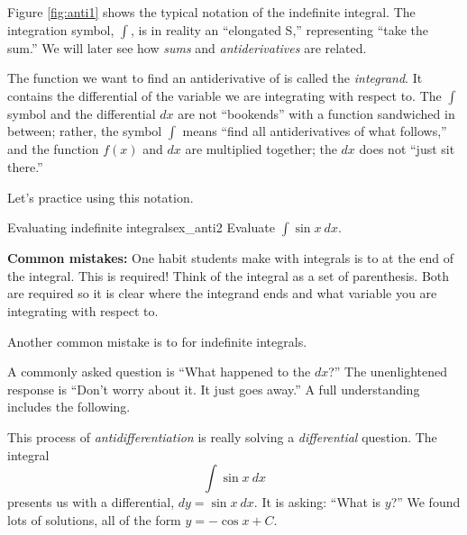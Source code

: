 

Figure \ref{fig:anti1} shows the typical notation of the indefinite integral. The integration symbol, $\int$, is in reality an ``elongated S,'' representing ``take the sum.'' We will later see how \textit{sums} and \textit{antiderivatives} are related.

The function we want to find an antiderivative of is called the \textit{integrand}. It contains the differential of the variable we are integrating with respect to. The $\int$ symbol and the differential $dx$ are not ``bookends'' with a function sandwiched in between; rather, the symbol $\int$ means ``find all antiderivatives of what follows,'' and the function $f(x)$ and $dx$ are multiplied together; the $dx$ does not ``just sit there.''

Let's practice using this notation.\\


\begin{example}{Evaluating indefinite integrals}{ex_anti2}{
Evaluate $\displaystyle \int \sin x\ dx.$}
\end{example}


{\bf Common mistakes:}
One habit students make with integrals is to  at the end of the integral.
This is required! Think of the integral as a set of parenthesis.
Both are required so it is clear where the integrand ends and what variable you are integrating with respect to.

Another common mistake is to  for indefinite integrals.


A commonly asked question is ``What happened to the $dx$?'' The unenlightened response is ``Don't worry about it. It just goes away.'' A full understanding includes the following.

This process of \textit{antidifferentiation} is really solving a \textit{differential} question. The integral $$\int \sin x\ dx$$ presents us with a differential, $dy = \sin x\ dx$. It is asking: ``What is $y$?'' We found lots of solutions, all of the form $y = -\cos x+C$.

